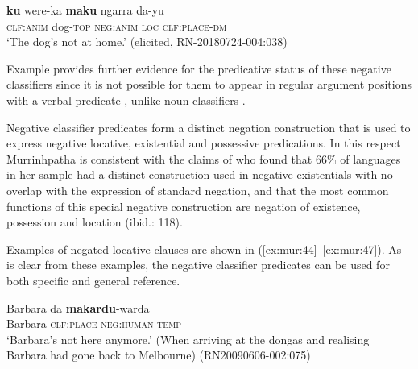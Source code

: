 \documentclass[output=paper,colorlinks,citecolor=brown]{langscibook}
\begin{document}
\ea\label{ex:mur:42}
    \gll  \textbf{ku} were-ka \textbf{maku} ngarra da-yu\\
         \textsc{clf:anim} dog-\textsc{top} \textsc{neg:anim} \textsc{loc} \textsc{clf:place-dm}\\
    \glt ‘The dog’s not at home.’ (elicited, RN-20180724-004:038)
\z 

Example  provides further evidence for the predicative status of these negative classifiers since it is not possible for them to appear in regular argument positions with a verbal predicate , unlike noun classifiers . 

\ea\label{ex:mur:43}
    \z
\z 

Negative classifier predicates form a distinct negation construction that is used to express negative locative, existential and possessive predications. In this respect Murrinhpatha is consistent with the claims of \citet[112]{Veselinova2013neg.exist} who found that 66\% of languages in her sample had a distinct construction used in negative existentials with no overlap with the expression of standard negation, and that the most common functions of this special negative construction are negation of existence, possession and location (ibid.: 118).

Examples of negated locative clauses are shown in (\ref{ex:mur:44}--\ref{ex:mur:47}). As is clear from these examples, the negative classifier predicates can be used for both specific and general reference.

\ea\label{ex:mur:44} 
    \gll  Barbara da \textbf{makardu}{}-warda\\
         Barbara \textsc{clf:place} \textsc{neg:human-temp}\\
    \glt ‘Barbara’s not here anymore.’ (When arriving at the dongas and realising Barbara had gone back to Melbourne) (RN20090606-002:075)  
\z 
\end{document}
